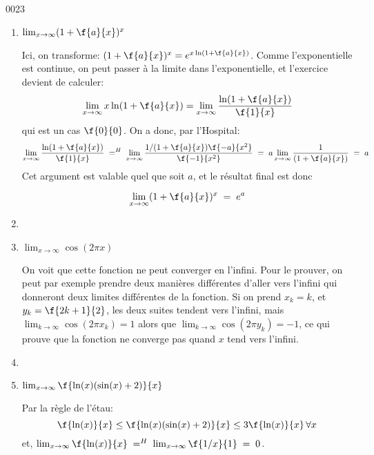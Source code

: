\begin{corrige}{0023}
\begin{alternative}
\begin{enumerate}
		\item $ \lim_{x\rightarrow  \infty}(1+\f{a}{x})^x$ 
		 
		Ici, on transforme: $ (1+\f{a}{x})^x = e^{x\ln(1+\f{a}{x})}$. Comme l'exponentielle est continue, on peut passer à la limite dans l'exponentielle, et l'exercice devient de calculer:
		 \[\lim_{x\rightarrow  \infty}x\ln(1+\f{a}{x}) = \lim_{x\rightarrow  \infty}\dfrac{\ln(1+\f{a}{x})}{\f{1}{x}}\]
		qui est un cas $\f{0}{0}$. On a donc, par l'Hospital:
		  \[\lim_{x\rightarrow  \infty}\dfrac{\ln(1+\f{a}{x})}{\f{1}{x}} \; =^H\;   \lim_{x\rightarrow  \infty}\dfrac{1/(1+\f{a}{x})\f{-a}{x^2}}{\f{-1}{x^2}} \; = \;      a\lim_{x\rightarrow  \infty}\dfrac{1}{(1+\f{a}{x})}   \;=\; a       \]
		Cet argument est valable quel que soit $a$, et le résultat final est donc  
		 
		 \[ \lim_{x\rightarrow  \infty}(1+\f{a}{x})^x \;= \; e^a\] 
		 
		\item

		 \item $\lim_{x\rightarrow \infty} \cos(2\pi x)$
		 
		 On voit que cette fonction ne peut converger en l'infini. Pour le prouver, on peut par exemple prendre deux manières différentes d'aller vers l'infini qui donneront deux limites différentes de la fonction. 
		Si on prend $x_k=k$, et $y_k = \f{2k+1}{2}$, les deux suites tendent vers l'infini, mais  
		 $\lim_{k\rightarrow \infty} \cos(2\pi x_k) = 1$ alors que $\lim_{k\rightarrow \infty} \cos(2\pi y_k) =  -1$, ce qui prouve que la fonction ne converge pas quand $x$ tend vers l'infini.
		 
		\item 

		  \item $\lim_{x\rightarrow \infty} \f{\ln(x)(\sin(x)+2)}{x}$
		 
		 Par la règle de l'étau:\[\f{\ln(x)}{x} \leq \f{\ln(x)(\sin(x)+2)}{x} \leq 3\f{\ln(x)}{x} \, \forall x\]
		 et, $\lim_{x\rightarrow \infty} \f{\ln(x)}{x} \; =^H \; \lim_{x\rightarrow \infty} \f{1/x}{1}  \;=\;0$.
		 
	\end{enumerate}
\end{alternative}

\end{corrige}
